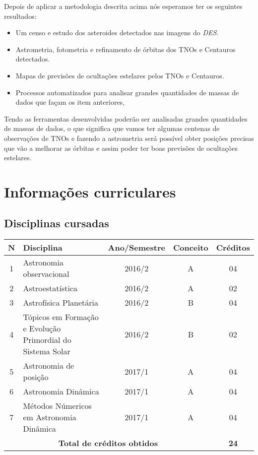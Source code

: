 \documentclass[a4paper, 11pt]{article}
\begin{document}
Depois de aplicar a metodologia descrita acima n\'os esperamos ter os seguintes resultados:
\begin{itemize}
\item Um censo e estudo dos asteroides detectados nas imagens do \textit{DES}.
\item Astrometria, fotometria e refinamento de \'orbitas dos TNOs e Centauros detectados.
\item Mapas de previs\~oes de oculta\c{c}\~oes estelares pelos TNOs e Centauros.
\item Processos automatizados para analisar grandes quantidades de massas de dados que fa\c{c}am os item anteriores,
\end{itemize}

Tendo as ferramentas desenvolvidas poder\~ao ser analisadas grandes quantidades de massas de dados, o que significa que vamos ter algumas centenas de observa\c{c}\~oes de TNOs e fazendo a astrometria ser\'a poss\'ivel obter posi\c{c}\~oes precisas que v\~ao a melhorar as \'orbitas e assim poder ter boas previs\~oes de oculta\c{c}\~oes estelares. 

\newpage

\section{Informa\c{c}\~oes curriculares}

\subsection{Disciplinas cursadas}

\begin{center}
\begin{tabular}{clccc}
\toprule
\textbf{N}&$\hspace{2cm}$\textbf{Disciplina} &\textbf{Ano/Semestre}&\textbf{Conceito}& \textbf{Cr\'editos} \\ \midrule
1 & Astronomia observacional                                             & 2016/2 & A & 04 \\ 
2 & Astroestatística                                                     & 2016/2 & A & 02 \\ 
3 & Astrofísica Planetária                                               & 2016/2 & B & 04 \\ 
4 & Tópicos em Formação e Evolução Primordial do Sistema Solar           & 2016/2 & B & 02 \\
5 & Astronomia de posição                                                & 2017/1 & A & 04 \\ 
6 & Astronomia Dinâmica                                                  & 2017/1 & A & 04 \\ 
7 & Métodos Númericos em Astronomia Dinâmica                             & 2017/1 & A & 04 \\ \midrule 
\multicolumn{4}{c}{\textbf{Total de cr\'editos obtidos}}               & \textbf{24} \\ \bottomrule
\end{tabular}
\end{center}
\end{document}
